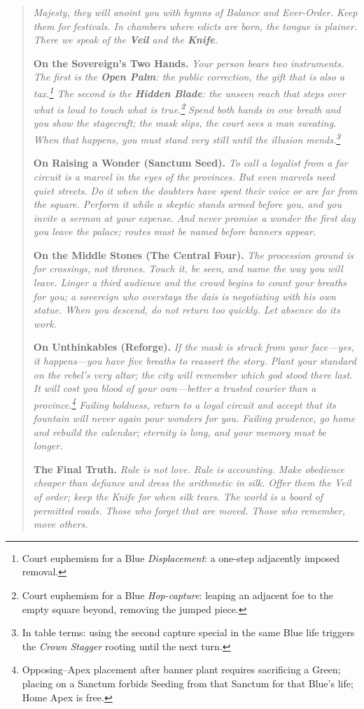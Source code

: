 \documentclass[11pt]{article}
\begin{document}
\begin{quote}\small
\emph{Majesty, they will anoint you with hymns of Balance and Ever-Order. Keep them for festivals. In chambers where edicts are born, the tongue is plainer. There we speak of the \textbf{Veil} and the \textbf{Knife}.}

\medskip
\textbf{On the Sovereign's Two Hands.} \emph{Your person bears two instruments. The first is the \textbf{Open Palm}: the public correction, the gift that is also a tax.\footnote{Court euphemism for a Blue \emph{Displacement}: a one-step adjacently imposed removal.} The second is the \textbf{Hidden Blade}: the unseen reach that steps over what is loud to touch what is true.\footnote{Court euphemism for a Blue \emph{Hop-capture}: leaping an adjacent foe to the empty square beyond, removing the jumped piece.}} \emph{Spend both hands in one breath and you show the stagecraft; the mask slips, the court sees a man sweating. When that happens, you must stand very still until the illusion mends.\footnote{In table terms: using the second capture special in the same Blue life triggers the \emph{Crown Stagger} rooting until the next turn.}}

\medskip
\textbf{On Raising a Wonder (Sanctum Seed).} \emph{To call a loyalist from a far circuit is a marvel in the eyes of the provinces. But even marvels need quiet streets. Do it when the doubters have spent their voice or are far from the square. Perform it while a skeptic stands armed before you, and you invite a sermon at your expense. And never promise a wonder the first day you leave the palace; routes must be named before banners appear.}

\medskip
\textbf{On the Middle Stones (The Central Four).} \emph{The procession ground is for crossings, not thrones. Touch it, be seen, and name the way you will leave. Linger a third audience and the crowd begins to count your breaths for you; a sovereign who overstays the dais is negotiating with his own statue. When you descend, do not return too quickly. Let absence do its work.}

\medskip
\textbf{On Unthinkables (Reforge).} \emph{If the mask is struck from your face---yes, it happens---you have five breaths to reassert the story. Plant your standard on the rebel's very altar; the city will remember which god stood there last. It will cost you blood of your own---better a trusted courier than a province.\footnote{Opposing--Apex placement after banner plant requires sacrificing a Green; placing on a Sanctum forbids Seeding from that Sanctum for that Blue's life; Home Apex is free.} Failing boldness, return to a loyal circuit and accept that its fountain will never again pour wonders for you. Failing prudence, go home and rebuild the calendar; eternity is long, and your memory must be longer.}

\medskip
\textbf{The Final Truth.} \emph{Rule is not love. Rule is accounting. Make obedience cheaper than defiance and dress the arithmetic in silk. Offer them the Veil of order; keep the Knife for when silk tears. The world is a board of permitted roads. Those who forget that are moved. Those who remember, move others.}
\end{quote}
\end{document}

